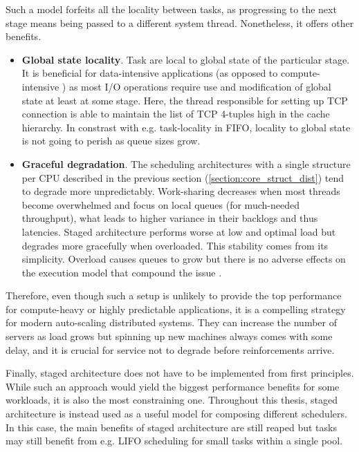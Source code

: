 \documentclass[12pt,a4paper,twoside]{report}
\begin{document}
Such a model forfeits all the locality between tasks, as progressing to the next stage means being passed to a different system thread. Nonetheless, it offers other benefits. 
\begin{itemize}
    \item \textbf{Global state locality}. Task are local to global state of the particular stage. It is beneficial for data-intensive applications (as opposed to compute-intensive \cite{Kleppmann2017-en}) as most I/O operations require use and modification of global state at least at some stage. Here, the thread responsible for setting up TCP connection is able to maintain the list of TCP 4-tuples high in the cache hierarchy. In constrast with e.g. task-locality in FIFO, locality to global state is not going to perish as queue sizes grow.
    \item \textbf{Graceful degradation}. The scheduling architectures with a single  structure per CPU described in the previous section (\ref{section:core_struct_dist}) tend to degrade more unpredictably. Work-sharing decreases when most threads become overwhelmed and focus on local queues (for much-needed throughput), what leads to higher variance in their backlogs and thus latencies. Staged architecture performs worse at low and optimal load but degrades more gracefully when overloaded. This stability comes from its simplicity. Overload causes queues to grow but there is no adverse effects on the execution model that compound the issue \cite{Welsh2001}.
\end{itemize}

Therefore, even though such a setup is unlikely to provide the top performance for compute-heavy or highly predictable applications, it is a compelling strategy for modern auto-scaling distributed systems. They can increase the number of servers as load grows but spinning up new machines always comes with some delay, and it is crucial for service not to degrade before reinforcements arrive.

\label{section:staged-as-composition}
Finally, staged architecture does not have to be implemented from first principles. While such an approach would yield the biggest performance benefits for some workloads, it is also the most constraining one. Throughout this thesis, staged architecture is instead used as a useful model for composing different schedulers. In this case, the main benefits of staged architecture are still reaped but tasks may still benefit from e.g. LIFO scheduling for small tasks within a single pool. 
\end{document}
